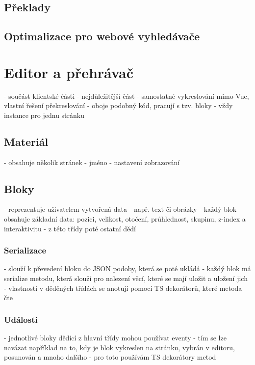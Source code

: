 \subsection{Překlady}

\subsection{Optimalizace pro webové vyhledávače}

\section{Editor a přehrávač}\label{text:realizace/editor}

- součást klientské části
- nejdůležitější část
- samostatné vykreslování mimo Vue, vlastní řešení překreslování
- oboje podobný kód, pracují s tzv. bloky
- vždy instance pro jednu stránku

\subsection{Materiál}

- obsahuje několik stránek
- jméno
- nastavení zobrazování

\subsection{Bloky}

- reprezentuje uživatelem vytvořená data
- např. text či obrázky
- každý blok obsahuje základní data: pozici, velikost, otočení, průhlednost, skupinu, z-index a interaktivitu
- z této třídy poté ostatní dědí

\subsubsection{Serializace}

- slouží k převedení bloku do JSON podoby, která se poté ukládá
- každý blok má serialize metodu, která slouží pro nalezení věcí, které se mají uložit a uložení jich
- vlastnosti v děděných třídách se anotují pomocí TS dekorátorů, které metoda čte

\subsubsection{Události}
- jednotlivé bloky dědící z hlavní třídy mohou používat eventy
- tím se lze navázat například na to, kdy je blok vykreslen na stránku, vybrán v editoru, posunován a mnoho dalšího
- pro toto používám TS dekorátory metod

